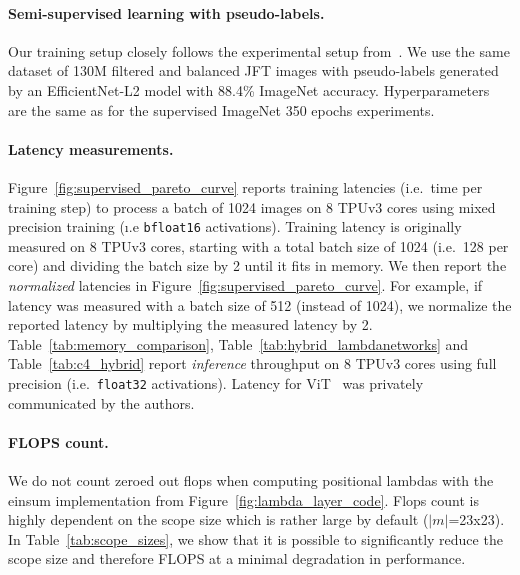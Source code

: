 \documentclass{article} \usepackage{iclr2021_conference,times}
\begin{document}
\vspace{-0.1cm}
\paragraph{Semi-supervised learning with pseudo-labels.}
Our training setup closely follows the experimental setup from~\cite{xie2020selftraining}.
We use the same dataset of 130M filtered and balanced JFT images with pseudo-labels generated by an EfficientNet-L2 model with 88.4\% ImageNet accuracy.
Hyperparameters are the same as for the supervised ImageNet 350 epochs experiments.

\vspace{-0.1cm}
\paragraph{Latency measurements.}
Figure~\ref{fig:supervised_pareto_curve} reports training latencies (i.e.\ time per training step) to process a batch of 1024 images on 8 TPUv3 cores using mixed precision training (\i.e \texttt{bfloat16} activations).
Training latency is originally measured on 8 TPUv3 cores, starting with a total batch size of 1024 (i.e.\ 128 per core) and dividing the batch size by 2 until it fits in memory.
We then report the \emph{normalized} latencies in Figure~\ref{fig:supervised_pareto_curve}.
For example, if latency was measured with a batch size of 512 (instead of 1024), we normalize the reported latency by multiplying the measured latency by 2.
Table~\ref{tab:memory_comparison}, Table~\ref{tab:hybrid_lambdanetworks} and Table~\ref{tab:c4_hybrid} report \emph{inference} throughput on 8 TPUv3 cores using full precision (i.e.\ \texttt{float32} activations).
Latency for ViT~\citep{dosovitskiy2020image} was privately communicated by the authors.

\vspace{-0.1cm}
\paragraph{FLOPS count.}
We do not count zeroed out flops when computing positional lambdas with the einsum implementation from Figure~\ref{fig:lambda_layer_code}.
Flops count is highly dependent on the scope size which is rather large by default ($|m|$=23x23).
In Table~\ref{tab:scope_sizes}, we show that it is possible to significantly reduce the scope size and therefore FLOPS at a minimal degradation in performance.

\vspace{-0.1cm}
\end{document}
